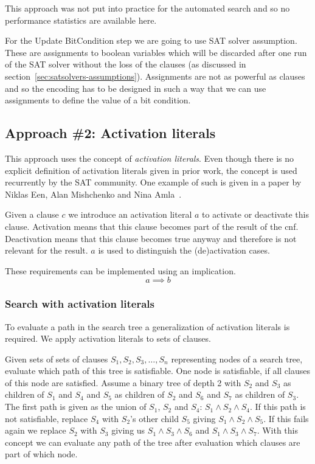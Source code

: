 This approach was not put into practice for the automated search and so no performance statistics are available here.

For the Update BitCondition step we are going to use SAT solver assumption. These are assignments to boolean variables which will be discarded after one run of the SAT solver without the loss of the clauses (as discussed in section~\ref{sec:satsolvers-assumptions}). Assignments are not as powerful as clauses and so the encoding has to be designed in such a way that we can use assignments to define the value of a bit condition.

\subsection{Approach \#2: Activation literals}
\label{sec:encoding:activation-literals}
%
This approach uses the concept of \emph{activation literals}. Even though there is no explicit definition of activation literals given in prior work, the concept is used recurrently by the SAT community. One example of such is given in a paper by Niklas Een, Alan Mishchenko and Nina Amla~\cite{Sat30}.

Given a clause $c$ we introduce an activation literal $a$ to activate or deactivate this clause. Activation means that this clause becomes part of the result of the \gls{cnf}. Deactivation means that this
clause becomes true anyway and therefore is not relevant for the result. $a$ is used to distinguish the (de)activation cases.

These requirements can be implemented using an implication.
\[
  a \implies b
\]

\subsubsection{Search with activation literals}
\label{sec:activation-literals-search}
%
To evaluate a path in the search tree a generalization of activation literals is required. We apply activation literals to sets of clauses.

Given sets of sets of clauses $S_1, S_2, S_3, \ldots, S_n$ representing nodes of a search tree, evaluate which path of this tree is satisfiable. One node is satisfiable, if all clauses of this node are satisfied. Assume a binary tree of depth 2 with $S_2$ and $S_3$ as children of $S_1$ and $S_4$ and $S_5$ as children of $S_2$ and $S_6$ and $S_7$ as children of $S_3$. The first path is given as the union of $S_1$, $S_2$ and $S_4$: $S_1 \land S_2 \land S_4$. If this path is not satisfiable, replace $S_4$ with $S_2$'s other child $S_5$ giving $S_1 \land S_2 \land S_5$. If this fails again we replace $S_2$ with $S_3$ giving us $S_1 \land S_3 \land S_6$ and $S_1 \land S_3 \land S_7$. With this concept we can evaluate any path of the tree after evaluation which clauses are part of which node.

